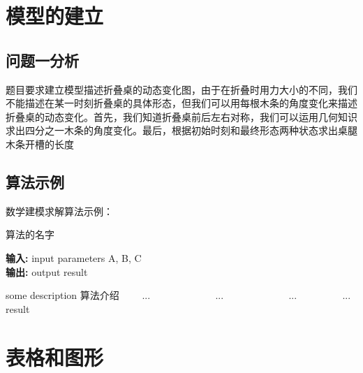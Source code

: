 \documentclass[bwprint]{gmcmthesis}
\numberwithin{equation}{section}
\numberwithin{figure}{section}
\numberwithin{table}{section}
\begin{document}


\section{模型的建立}

\subsection{问题一分析}
题目要求建立模型描述折叠桌的动态变化图，由于在折叠时用力大小的不同，我们不能描述在某一时刻折叠桌的具体形态，但我们可以用每根木条的角度变化来描述折叠桌的动态变化。首先，我们知道折叠桌前后左右对称，我们可以运用几何知识求出四分之一木条的角度变化。最后，根据初始时刻和最终形态两种状态求出桌腿木条开槽的长度


\subsection{算法示例}

数学建模求解算法示例：

\begin{center}
\begin{minipage}{0.8\textwidth}
\begin{algorithm}[H]%
\caption{算法的名字} %
{\bf 输入:} %
input parameters A, B, C\\
{\bf 输出:} %
output result
\begin{algorithmic}[1]
\State some description 算法介绍 %
　　\State ...
　　　　\State ...
　　\Else
　　　　\State ...
　　\EndIf
\EndFor
{} %
　　\State ...
\EndWhile
\State \Return result
\end{algorithmic}
\end{algorithm}
\end{minipage}
\end{center}


\section{表格和图形}
\end{document}
